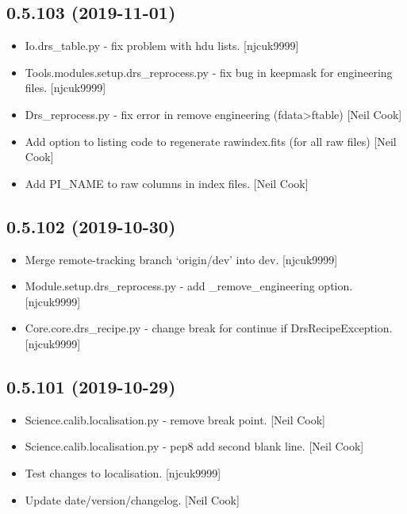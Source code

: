 \documentclass[a4paper,10pt,english]{report}
\begin{document}
\subsection{0.5.103 (2019-11-01)}
\label{\detokenize{misc/changelog:id38}}\begin{itemize}
\item {} 
Io.drs\_table.py - fix problem with hdu lists. {[}njcuk9999{]}

\item {} 
Tools.modules.setup.drs\_reprocess.py - fix bug in keepmask for
engineering files. {[}njcuk9999{]}

\item {} 
Drs\_reprocess.py - fix error in remove engineering (fdata\textendash{}\textgreater{}ftable)
{[}Neil Cook{]}

\item {} 
Add option to listing code to regenerate rawindex.fits (for all raw
files) {[}Neil Cook{]}

\item {} 
Add PI\_NAME to raw columns in index files. {[}Neil Cook{]}

\end{itemize}


\subsection{0.5.102 (2019-10-30)}
\label{\detokenize{misc/changelog:id39}}\begin{itemize}
\item {} 
Merge remote-tracking branch ‘origin/dev’ into dev. {[}njcuk9999{]}

\item {} 
Module.setup.drs\_reprocess.py - add \_remove\_engineering option.
{[}njcuk9999{]}

\item {} 
Core.core.drs\_recipe.py - change break for continue if
DrsRecipeException. {[}njcuk9999{]}

\end{itemize}


\subsection{0.5.101 (2019-10-29)}
\label{\detokenize{misc/changelog:id40}}\begin{itemize}
\item {} 
Science.calib.localisation.py - remove break point. {[}Neil Cook{]}

\item {} 
Science.calib.localisation.py - pep8 add second blank line. {[}Neil
Cook{]}

\item {} 
Test changes to localisation. {[}njcuk9999{]}

\item {} 
Update date/version/changelog. {[}Neil Cook{]}

\end{itemize}
\end{document}
